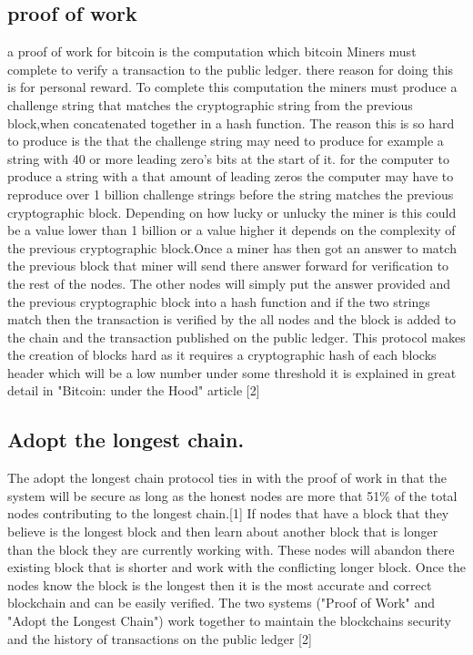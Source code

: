 \documentclass[report]{IEEEtran}
\begin{document}
\subsection{proof of work}
a proof of work for bitcoin is the computation which bitcoin Miners must complete to verify a transaction to the public ledger. there reason for doing this is for personal reward. To complete this computation the miners must produce a challenge string that matches the cryptographic string from the previous block,when concatenated together in a hash function. The reason this is so hard to produce is the that the challenge string may need to produce for example a string with 40 or more leading zero's bits at the start of it. for the computer to produce a string with a that amount of leading zeros the computer may have to reproduce over 1 billion challenge strings before the string matches the previous cryptographic block. Depending on how lucky or unlucky the miner is this could be a value lower than 1 billion or a value higher it depends on the complexity of the previous cryptographic block.Once a miner has then got an answer to match the previous block that miner will send there answer forward for verification to the rest of the nodes. The other nodes will simply put the answer provided and the previous cryptographic block into a hash function and if the two strings match then the transaction is verified by the all nodes and the block is added to the chain and the transaction published on the public ledger. This protocol makes the creation of blocks hard as it requires a cryptographic hash of each blocks header which will be a low number under some threshold it is explained in great detail in "Bitcoin: under the Hood" article [2] 
\subsection{Adopt the longest chain.}
The adopt the longest chain protocol ties in with the proof of work in that the system will be secure as long as the honest nodes are more that 51\% of the total nodes contributing to the longest chain.[1] If nodes that have a block that they believe is the longest block and then learn about another block that is longer than the block they are currently working with. These nodes will abandon there existing block that is shorter and work with the conflicting longer block. Once the nodes know the block is the longest then it is the most accurate and correct blockchain and can be easily verified. The two systems ("Proof of Work" and "Adopt the Longest Chain") work together to maintain the blockchains security and the history of transactions on the public ledger [2] 
\end{document}
